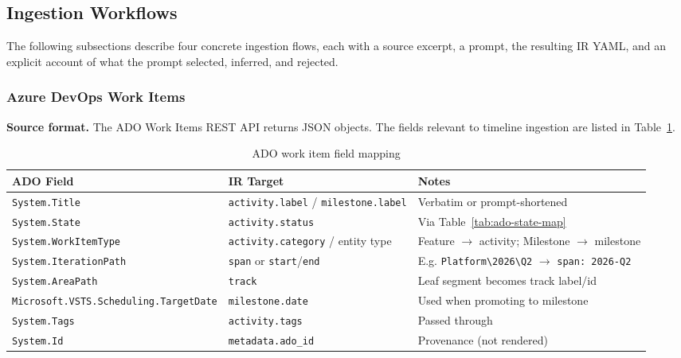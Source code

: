 \subsection{Ingestion Workflows}
\label{sec:ingestion-workflows}

The following subsections describe four concrete ingestion flows, each with a source
excerpt, a prompt, the resulting IR YAML, and an explicit account of what the prompt
selected, inferred, and rejected.

\subsubsection{Azure DevOps Work Items}
\label{sec:ingest-ado}

\textbf{Source format.} The ADO Work Items REST API \cite{ado-workitems} returns JSON
objects. The fields relevant to timeline ingestion are listed in
Table~\ref{tab:ado-field-mapping}.

\begin{table}[h]
\centering
\small
\begin{tabular}{lll}
\toprule
\textbf{ADO Field} & \textbf{IR Target} & \textbf{Notes} \\
\midrule
\texttt{System.Title} & \texttt{activity.label} / \texttt{milestone.label} & Verbatim or
  prompt-shortened \\
\texttt{System.State} & \texttt{activity.status} & Via Table~\ref{tab:ado-state-map} \\
\texttt{System.WorkItemType} & \texttt{activity.category} / entity type & Feature $\to$
  activity; Milestone $\to$ milestone \\
\texttt{System.IterationPath} & \texttt{span} or \texttt{start}/\texttt{end} & E.g.
  \texttt{Platform\textbackslash 2026\textbackslash Q2} $\to$ \texttt{span: 2026-Q2} \\
\texttt{System.AreaPath} & \texttt{track} & Leaf segment becomes track label/id \\
\texttt{Microsoft.VSTS.Scheduling.TargetDate} & \texttt{milestone.date} & Used when
  promoting to milestone \\
\texttt{System.Tags} & \texttt{activity.tags} & Passed through \\
\texttt{System.Id} & \texttt{metadata.ado\_id} & Provenance (not rendered) \\
\bottomrule
\end{tabular}
\caption{ADO work item field mapping}
\label{tab:ado-field-mapping}
\end{table}

